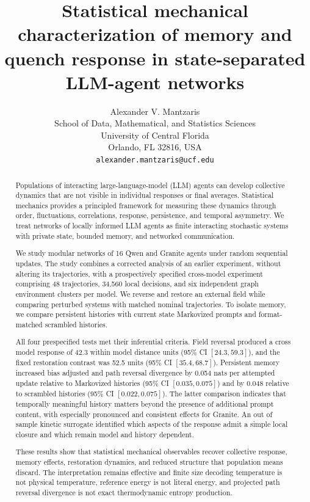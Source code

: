 \documentclass[12pt]{article}
\title{Statistical mechanical characterization of memory and quench response in state-separated LLM-agent networks}
\author{Alexander V. Mantzaris\\
  School of Data, Mathematical, and Statistics Sciences \\
  University of Central Florida\\
  Orlando, FL 32816, USA\\
  \texttt{alexander.mantzaris@ucf.edu}}
\date{}
\begin{document}
\maketitle

\begin{abstract}
Populations of interacting large-language-model (LLM) agents can develop
collective dynamics that are not visible in individual responses or final
averages. Statistical mechanics provides a principled framework for measuring
these dynamics through order, fluctuations, correlations, response,
persistence, and temporal asymmetry. We treat networks of locally informed LLM
agents as finite interacting stochastic systems with private state, bounded
memory, and networked communication.

We study modular networks of 16 Qwen and Granite agents under
random sequential updates. The study combines a corrected analysis of an
earlier experiment, without altering its trajectories, with a prospectively
specified cross-model experiment comprising 48 trajectories, 34,560 local
decisions, and six independent graph environment clusters per model. We
reverse and restore an external field while comparing perturbed systems with
matched nominal trajectories. To isolate memory, we compare persistent
histories with current state Markovized prompts and format-matched scrambled
histories.

All four prespecified tests met their inferential criteria. Field reversal
produced a cross model response of 42.3 within model distance units (95\% CI
$[24.3,59.3]$), and the fixed restoration contrast was 52.5 units (95\% CI
$[35.4,68.7]$). Persistent memory increased bias adjusted and path reversal
divergence by 0.054 nats per attempted update relative to Markovized histories
(95\% CI $[0.035,0.075]$) and by 0.048 relative to scrambled histories (95\%
CI $[0.022,0.075]$). The latter comparison indicates that temporally
meaningful history matters beyond the presence of additional prompt content,
with especially pronounced and consistent effects for Granite. An
out of sample kinetic surrogate identified which aspects of the response admit
a simple local closure and which remain model and history dependent.

These results show that statistical mechanical observables recover collective
response, memory effects, restoration dynamics, and reduced structure that
population means discard. The interpretation remains effective and
finite size  decoding temperature is not physical temperature, reference
energy is not literal energy, and projected path reversal divergence is not
exact thermodynamic entropy production.
\end{abstract}
\end{document}

